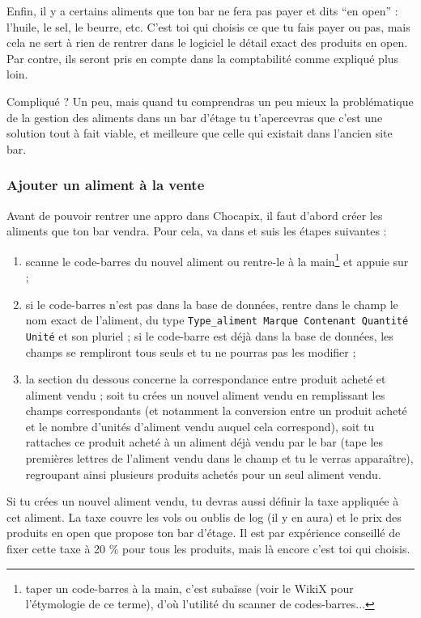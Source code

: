 \documentclass[12pt,french]{article}
\begin{document}
Enfin, il y a certains aliments que ton bar ne fera pas payer et dits \enquote{en open} : l'huile, le sel, le beurre, etc. C'est toi qui choisis ce que tu fais payer ou pas, mais cela ne sert à rien de rentrer dans le logiciel le détail exact des produits en open. Par contre, ils seront pris en compte dans la comptabilité comme expliqué plus loin.

Compliqué ? Un peu, mais quand tu comprendras un peu mieux la problématique de la gestion des aliments dans un bar d'étage tu t'apercevras que c'est une solution tout à fait viable, et meilleure que celle qui existait dans l'ancien site bar.

\subsubsection{Ajouter un aliment à la vente\label{ajout}}

Avant de pouvoir rentrer une appro dans Chocapix, il faut d'abord créer les aliments que ton bar vendra. Pour cela, va dans  et suis les étapes suivantes :
\begin{enumerate}
	\item scanne le code-barres du nouvel aliment ou rentre-le à la main\footnote{taper un code-barres à la main, c'est subaïsse (voir le WikiX pour l'étymologie de ce terme), d'où l'utilité du scanner de codes-barres...} et appuie sur  ;
	\item si le code-barres n'est pas dans la base de données, rentre dans le champ  le nom exact de l'aliment, du type \texttt{Type\_aliment Marque Contenant Quantité Unité} et son pluriel ; si le code-barre est déjà dans la base de données, les champs se rempliront tous seuls et tu ne pourras pas les modifier ;
	\item la section du dessous concerne la correspondance entre produit acheté et aliment vendu ; soit tu crées un nouvel aliment vendu en remplissant les champs correspondants (et notamment la conversion entre un produit acheté et le nombre d'unités d'aliment vendu auquel cela correspond), soit tu rattaches ce produit acheté à un aliment déjà vendu par le bar (tape les premières lettres de l'aliment vendu dans le champ  et tu le verras apparaître), regroupant ainsi plusieurs produits achetés pour un seul aliment vendu.
\end{enumerate}
Si tu crées un nouvel aliment vendu, tu devras aussi définir la taxe appliquée à cet aliment. La taxe couvre les vols ou oublis de log (il y en aura) et le prix des produits en open que propose ton bar d'étage. Il est par expérience conseillé de fixer cette taxe à 20 \% pour tous les produits, mais là encore c'est toi qui choisis.
\end{document}
